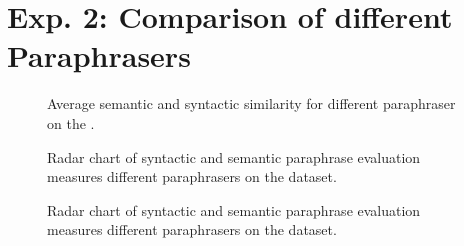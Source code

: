 \section{Exp. 2: Comparison of different Paraphrasers}
\label{sec:app_paraphrases}

\begin{figure}[htbp]
    \centering
    
    \caption{Average semantic and syntactic similarity for different paraphraser on the \dataGutenberg{}.}
    \label{fig:sem_syn_gutenberg}
\end{figure}

\begin{figure}[htbp]
    \centering
    
    \caption{Radar chart of syntactic and semantic paraphrase evaluation measures different paraphrasers on the \dataGutenberg{} dataset.}
    \label{fig:radar_gutenberg}
\end{figure}

\begin{figure}[htbp]
    \centering
    
    \caption{Radar chart of syntactic and semantic paraphrase evaluation measures different paraphrasers on the \dataBlog{} dataset.}
    \label{fig:radar_blog}
\end{figure}
